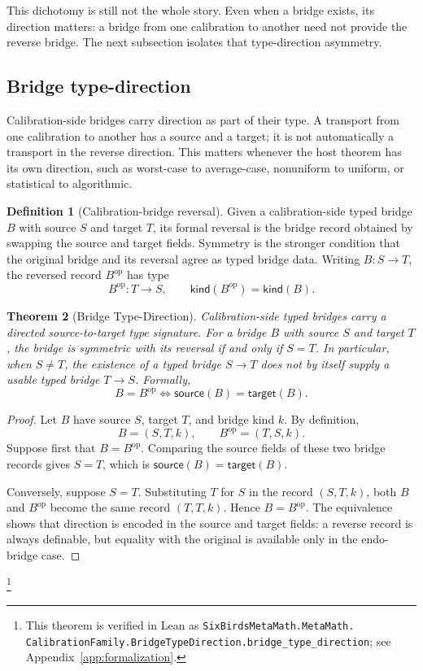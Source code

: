\documentclass[11pt]{article}
\newcommand{\TypedBridgeCalibration}{calibration-side typed bridge}
\newtheorem{theorem}{Theorem}[section]
\theoremstyle{definition}
\newtheorem{definition}[theorem]{Definition}
\begin{document}
This dichotomy is still not the whole story.  Even when a bridge exists,
its direction matters: a bridge from one calibration to another need not
provide the reverse bridge.  The next subsection isolates that
type-direction asymmetry.

\subsection{Bridge type-direction}\label{sec:calibration:bridge-type-direction}

Calibration-side bridges carry direction as part of their type.  A
transport from one calibration to another has a source and a target; it
is not automatically a transport in the reverse direction.  This matters
whenever the host theorem has its own direction, such as worst-case to
average-case, nonuniform to uniform, or statistical to algorithmic.

\begin{definition}[Calibration-bridge reversal]\label{def:calibration-bridge-reversal}
Given a \TypedBridgeCalibration{} \(B\) with source \(S\) and target
\(T\), its formal reversal is the bridge record obtained by swapping the
source and target fields.  Symmetry is the stronger condition that the
original bridge and its reversal agree as typed bridge data.
Writing \(B:S\to T\), the reversed record \(B^{\mathrm{op}}\) has type
\[
  B^{\mathrm{op}}:T\to S,
  \qquad
  \mathsf{kind}(B^{\mathrm{op}})=\mathsf{kind}(B).
\]
\end{definition}

\begin{theorem}[Bridge Type-Direction]\label{thm:bridge-type-direction}
Calibration-side typed bridges carry a directed source-to-target type
signature.  For a bridge \(B\) with source \(S\) and target \(T\), the
bridge is symmetric with its reversal if and only if \(S=T\).  In
particular, when \(S\ne T\), the existence of a typed bridge \(S\to T\)
does not by itself supply a usable typed bridge \(T\to S\).
Formally,
\[
  B=B^{\mathrm{op}}
  \iff
  \mathsf{source}(B)=\mathsf{target}(B).
\]
\end{theorem}

\begin{proof}
Let \(B\) have source \(S\), target \(T\), and bridge kind \(k\).  By
definition,
\[
  B=(S,T,k),
  \qquad
  B^{\mathrm{op}}=(T,S,k).
\]
Suppose first that \(B=B^{\mathrm{op}}\).  Comparing the source fields
of these two bridge records gives \(S=T\), which is
\(\mathsf{source}(B)=\mathsf{target}(B)\).

Conversely, suppose \(S=T\).  Substituting \(T\) for \(S\) in the
record \((S,T,k)\), both \(B\) and \(B^{\mathrm{op}}\) become the same
record \((T,T,k)\).  Hence \(B=B^{\mathrm{op}}\).  The equivalence
shows that direction is encoded in the source and target fields: a
reverse record is always definable, but equality with the original is
available only in the endo-bridge case.
\end{proof}\footnote{\raggedright This theorem is verified in Lean as
\texttt{SixBirdsMetaMath.MetaMath.\allowbreak
CalibrationFamily.BridgeTypeDirection.\allowbreak bridge\_type\_direction};
see Appendix~\ref{app:formalization}.}
\end{document}
